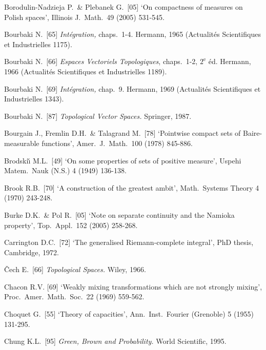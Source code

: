 {Borodulin-Nadzieja P.\ \& Plebanek G.\ [05] `On compactness of measures on
Polish spaces', Illinois J.\ Math.\ 49 (2005) 531-545.
\cmmnt{[451L.]}

Bourbaki N.\ [65] {\it Int\'egration,} chaps.~1-4.   Hermann, 1965
(Actualit\'es Scientifiques et Industrielles 1175).

Bourbaki N.\ [66] {\it Espaces Vectoriels Topologiques}, chaps.~1-2,
$2^{\text{e}}$ \'ed.
Hermann, 1966 (Actualit\'es Scientifiques et Industrielles 1189).
\cmmnt{[4A2J.]}

Bourbaki N.\ [69] {\it Int\'egration,} chap.~9.   Hermann, 1969
(Actualit\'es Scientifiques et Industrielles 1343).
\cmmnt{[\S436 {\it notes.}]}

Bourbaki N.\ [87] {\it Topological Vector Spaces.}  Springer, 1987.
\cmmnt{[\S461 {\it notes\/}, \S4A4.]}

Bourgain J., Fremlin D.H.\ \& Talagrand M.\ [78] `Pointwise compact
sets of Baire-measurable functions', Amer.\ J.\ Math.\ 100 (1978)
845-886.
\cmmnt{[462Ye.]}

Brodski\v{\i} M.L.\ [49] `On some properties of sets of positive measure',
Uspehi Matem.\ Nauk (N.S.) 4 (1949) 136-138.
\cmmnt{[498B.]}

Brook R.B.\ [70] `A construction of the greatest ambit', 
Math.\ Systems Theory 4 (1970) 243-248.
\cmmnt{[449D.]}

Burke D.K.\ \& Pol R.\ [05] `Note on separate continuity and the Namioka
property', Top.\ Appl.\ 152 (2005) 258-268.
\cmmnt{[\S463 {\it notes.}]}
  
\medskip%

Carrington D.C.\ [72] `The generalised Riemann-complete integral', PhD
thesis, Cambridge, 1972.
\cmmnt{[481L.]}

\v{C}ech E.\ [66] {\it Topological Spaces.}  Wiley, 1966.
\cmmnt{[\S4A2, 4A3R.]}

Chacon R.V. [69]
`Weakly mixing transformations which are not strongly mixing',
Proc.\ Amer.\ Math.\ Soc.\ 22 (1969) 559-562.
\cmmnt{[494F.]}

Choquet G.\ [55] `Theory of capacities', Ann.\ Inst.\ Fourier (Grenoble)
5 (1955) 131-295.
\cmmnt{[432K.]}

Chung K.L.\ [95] {\it Green, Brown and Probability.}   World Scientific,
1995.

}

